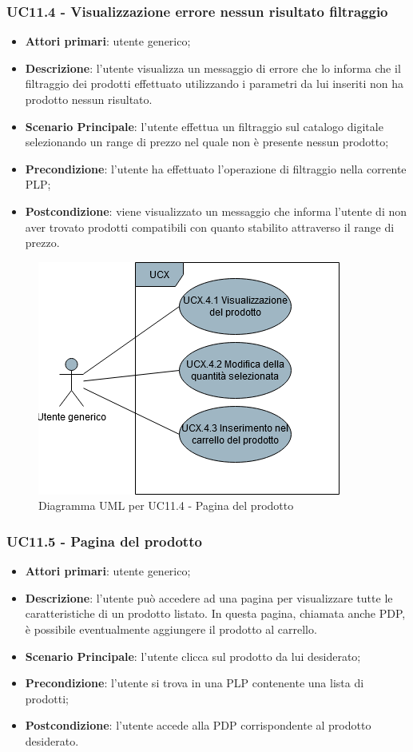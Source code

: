 \subsubsection{UC11.4 - Visualizzazione errore nessun risultato filtraggio}
\begin{itemize}
\item \textbf{Attori primari}: utente generico;
\item \textbf{Descrizione}: l'utente visualizza un messaggio di errore che lo informa che il filtraggio dei prodotti effettuato utilizzando i parametri da lui inseriti non ha prodotto nessun risultato.
\item \textbf{Scenario Principale}: l'utente effettua un filtraggio sul catalogo digitale selezionando un range di prezzo nel quale non è presente nessun prodotto;
\item \textbf{Precondizione}: l'utente ha effettuato l'operazione di filtraggio nella corrente PLP;
\item \textbf{Postcondizione}: viene visualizzato un messaggio che informa l'utente di non aver trovato prodotti compatibili con quanto stabilito attraverso il range di prezzo.
\end{itemize}
\begin{figure}[H]
\centering
\includegraphics[scale=0.6]{res/UseCase/Immagini/PaginaDelProdotto}
\caption{Diagramma UML per UC11.4 - Pagina del prodotto}
\end{figure}
\subsubsection{UC11.5 - Pagina del prodotto}
\begin{itemize}
\item \textbf{Attori primari}: utente generico;
\item \textbf{Descrizione}: l'utente può accedere ad una pagina per visualizzare tutte le caratteristiche di un prodotto listato. In questa pagina, chiamata anche PDP, è possibile eventualmente aggiungere il prodotto al carrello.
\item \textbf{Scenario Principale}: l'utente clicca sul prodotto da lui desiderato;
\item \textbf{Precondizione}: l'utente si trova in una PLP contenente una lista di prodotti;
\item \textbf{Postcondizione}: l'utente accede alla PDP corrispondente al prodotto desiderato.
\end{itemize}